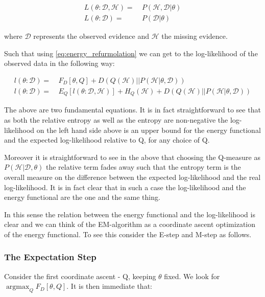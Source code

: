 \documentclass[11pt]{article}
\begin{document}
\begin{article}
\begin{align} \label{eq:likelihood_particle}
L (\theta: \mathscr{D}, \mathscr{H}) =& \  P (\mathscr{H}, \mathscr{D}| \theta)\\
L (\theta: \mathscr{D}) =& \ P (\mathscr{D}| \theta)
\end{align}

where \(\mathscr{D}\) represents the observed evidence and
\(\mathscr{H}\) the missing evidence.

Such that using \ref{eq:energy_refurmolation} we can get to the
log-likelihood of the observed data in the following way:

\begin{align} \label{eq:likelihood_energy_functional_relation}
l (\theta: \mathscr{D}) =& \  F_D[\theta, Q] + D (Q (\mathscr{H}) || P (\mathscr{H}| \theta, \mathscr{D})) \\
l (\theta: \mathscr{D}) =& \  E_Q[l (\theta: \mathscr{D}, \mathscr{H})]+ H_Q (\mathscr {H}) + D (Q (\mathscr{H}) || P (\mathscr{H}| \theta, \mathscr{D}))
\end{align}

The above are two fundamental equations. It is in fact
straightforward to see that as both the relative entropy as well as
the entropy are non-negative the log-likelihood on the left hand
side above is an upper bound for the energy functional and the expected
log-likelihood relative to Q, for any choice of Q.

Moreover it is straightforward to see in the above that choosing the
Q-measure as \(P (\mathscr{H}| \mathscr{D}, \theta)\) the relative term
fades away such that the entropy term is the overall measure on the
difference between the expected log-likelihood and the real
log-likelihood. It is in fact clear that in such a case the
log-likelihood and the energy functional are the one and the same
thing.

In this sense the relation between the energy functional and the
log-likelihood is clear and we can think of the EM-algorithm as a
coordinate ascent optimization of the energy functional. To see this
consider the E-step and M-step as follows.

\subsubsection{The Expectation Step}
\label{sec:org037e406}

Consider the first coordinate ascent - Q, keeping \(\theta\)
fixed. We look for \(\operatorname*{argmax}_{Q} F_D[\theta, Q]\). It
is then immediate that:


\end{article}
\end{document}
